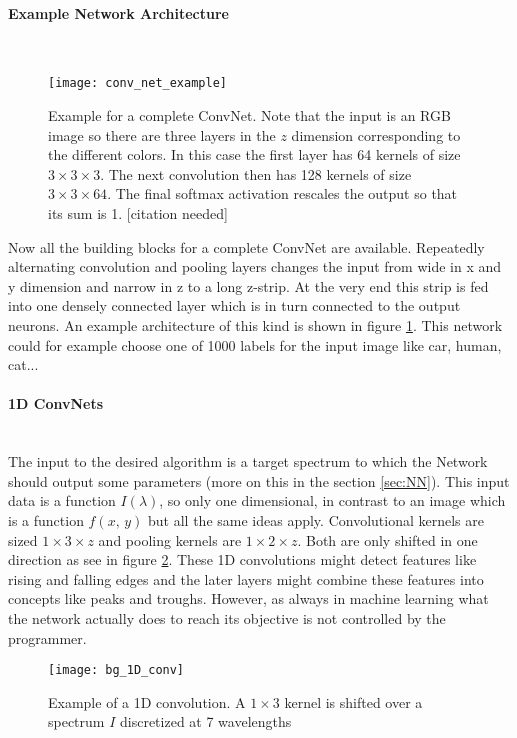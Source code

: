 \paragraph{Example Network Architecture}~\\
\begin{figure}[H]
    \centering
    \texttt{[image: conv\_net\_example]}
    \caption{Example for a complete ConvNet. Note that the input is an RGB image so there are three layers in the $z$ dimension corresponding to the different colors. In this case the first layer has 64 kernels of size $3 \times 3 \times 3$. The next convolution then has 128 kernels of size $3 \times 3 \times 64$. The final softmax activation rescales the output so that its sum is 1. [citation needed]}
    \label{fig:bg:NN_example}
\end{figure}

Now all the building blocks for a complete ConvNet are available. Repeatedly alternating convolution and pooling layers changes the input from wide in x and y dimension and narrow in z to a long z-strip. At the very end this strip is fed into one densely connected layer which is in turn connected to the output neurons. An example architecture of this kind is shown in figure \ref{fig:bg:NN_example}. This network could for example choose one of 1000 labels for the input image like car, human, cat...



\paragraph{1D ConvNets}~\\
The input to the desired algorithm is a target spectrum to which the Network should output some parameters (more on this in the section \ref{sec:NN}). This input data is a function $I(\lambda)$, so only one dimensional, in contrast to an image which is a function $f(x, \, y)$ but all the same ideas apply. Convolutional kernels are sized $1 \times 3 \times z$ and pooling kernels are $1 \times 2 \times z$. Both are  only shifted in one direction as see in figure \ref{fig:bg:1D_conv}. These 1D convolutions might detect features like rising and falling edges and the later layers might combine these features into concepts like peaks and troughs. However, as always in machine learning what the network actually does to reach its objective is not controlled by the programmer.

\begin{figure}[H]
    \centering
    \texttt{[image: bg\_1D\_conv]}
    \caption{Example of a 1D convolution. A $1 \times 3$ kernel is shifted over a spectrum $I$ discretized at 7 wavelengths}
    \label{fig:bg:1D_conv}
\end{figure}
\vspace{1.5cm}

